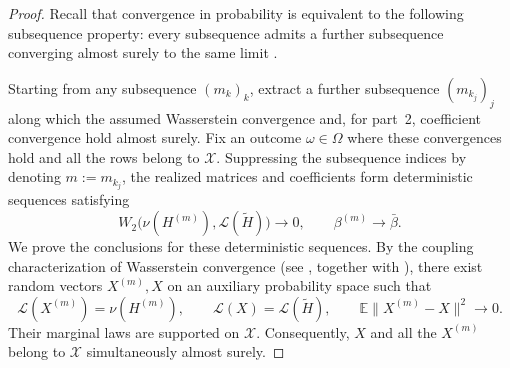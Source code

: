         \begin{proof}
        Recall that convergence in probability is equivalent to the
        following subsequence property: every subsequence admits a
        further subsequence converging almost surely to the same limit
        \cite[Lemma~5.2]{kallenberg2021foundations}.
        
        Starting from any subsequence $(m_k)_k$, extract a further
        subsequence $(m_{k_j})_j$ along which the assumed Wasserstein convergence
        and, for part~2, coefficient convergence hold almost surely.
        Fix an outcome $\omega \in \Omega$ where these convergences hold and all the rows
        belong to $\mathcal X$.
        Suppressing the subsequence indices by denoting $m := m_{k_j}$, the realized matrices
        and coefficients form deterministic sequences satisfying
        \[
            W_2\bigl(\nu(H^{(m)}),\mathscr L(\tilde H)\bigr)
            \longrightarrow0,
            \qquad
            \beta^{(m)}\longrightarrow\bar\beta
            .
        \]
        We prove the conclusions for these deterministic sequences.
        By the coupling characterization of Wasserstein convergence
        (see \cite[Definition~6.8 and Theorem~6.9]{villani2009optimal},
        together with
        \cite[Theorems~5.12 and~5.31 and Lemma~5.11(ii)]
        {kallenberg2021foundations}),
        there exist random vectors $X^{(m)},X$ on an auxiliary
        probability space such that
        \[
            \mathscr L(X^{(m)})=\nu(H^{(m)}),
            \qquad
            \mathscr L(X)=\mathscr L(\tilde H),
            \qquad
            \mathbb E\|X^{(m)}-X\|^2\longrightarrow0.
        \]
        Their marginal laws are supported on $\mathcal X$.
        Consequently, $X$ and all the $X^{(m)}$ belong to
        $\mathcal X$ simultaneously almost surely.
        

\end{proof}
